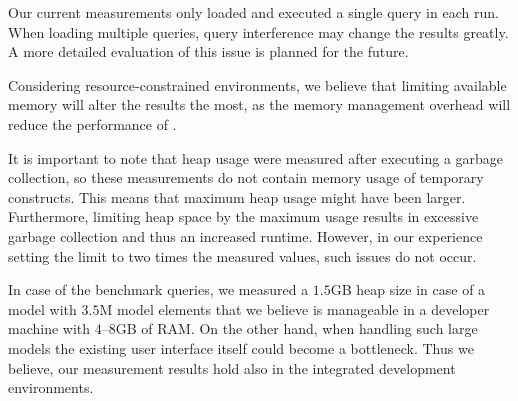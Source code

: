 Our current measurements only loaded and executed a single query in each run.
When loading multiple queries, query interference may change the results
greatly. A more detailed evaluation of this issue is planned for the future.

Considering resource-constrained environments, we believe that limiting
available memory will alter the results the most, as the memory management
overhead will reduce the performance of \incquery{}.

It is important to note that heap usage were measured after executing a garbage
collection, so these measurements do not contain memory usage of temporary
constructs. This means that maximum heap usage might have been larger. Furthermore,
limiting heap space by the maximum usage results in excessive garbage collection
and thus an increased runtime. However, in our experience setting the limit to
two times the measured values, such issues do not occur.

In case of the benchmark queries, we measured a $1.5$GB heap size in case of a
model with $3.5$M model elements that we believe is manageable in a developer
machine with $4$--$8$GB of RAM. On the other hand, when handling such large
models the existing user interface itself could become a bottleneck. Thus we
believe, our measurement results hold also in the integrated development
environments.
